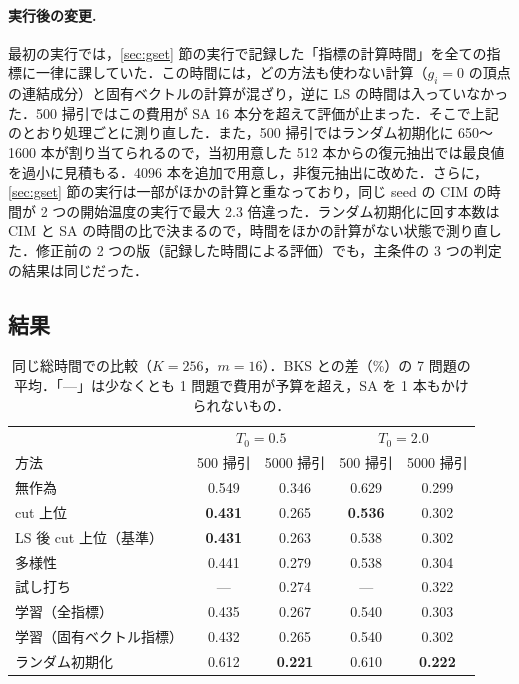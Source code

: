 \paragraph{実行後の変更.} 最初の実行では，\ref{sec:gset} 節の実行で記録した「指標の計算時間」を全ての指標に一律に課していた．この時間には，どの方法も使わない計算（$g_i=0$ の頂点の連結成分）と固有ベクトルの計算が混ざり，逆に LS の時間は入っていなかった．500 掃引ではこの費用が SA 16 本分を超えて評価が止まった．そこで上記のとおり処理ごとに測り直した．また，500 掃引ではランダム初期化に 650〜1600 本が割り当てられるので，当初用意した 512 本からの復元抽出では最良値を過小に見積もる．4096 本を追加で用意し，非復元抽出に改めた．さらに，\ref{sec:gset} 節の実行は一部がほかの計算と重なっており，同じ seed の CIM の時間が 2 つの開始温度の実行で最大 2.3 倍違った．ランダム初期化に回す本数は CIM と SA の時間の比で決まるので，時間をほかの計算がない状態で測り直した．修正前の 2 つの版（記録した時間による評価）でも，主条件の 3 つの判定の結果は同じだった．

\subsection{結果}

\begin{table}[t]
\centering
\caption{同じ総時間での比較（$K=256$，$m=16$）．BKS との差（\%）の 7 問題の平均．「—」は少なくとも 1 問題で費用が予算を超え，SA を 1 本もかけられないもの．}\label{tab:selection}
\small
\begin{tabular}{lcccc}
\toprule
 & \multicolumn{2}{c}{$T_0=0.5$} & \multicolumn{2}{c}{$T_0=2.0$} \\
方法 & 500 掃引 & 5000 掃引 & 500 掃引 & 5000 掃引 \\
\midrule
無作為 & 0.549 & 0.346 & 0.629 & 0.299 \\
cut 上位 & \textbf{0.431} & 0.265 & \textbf{0.536} & 0.302 \\
LS 後 cut 上位（基準） & \textbf{0.431} & 0.263 & 0.538 & 0.302 \\
多様性 & 0.441 & 0.279 & 0.538 & 0.304 \\
試し打ち & --- & 0.274 & --- & 0.322 \\
学習（全指標） & 0.435 & 0.267 & 0.540 & 0.303 \\
学習（固有ベクトル指標） & 0.432 & 0.265 & 0.540 & 0.302 \\
ランダム初期化 & 0.612 & \textbf{0.221} & 0.610 & \textbf{0.222} \\
\bottomrule
\end{tabular}
\end{table}

